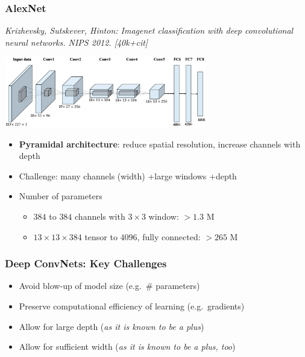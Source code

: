 \documentclass[compress]{beamer}
\newcommand{\textbblue}[1]{{\bf\color{Blue} #1}}
\newcommand{\is}[1]{\setlength{\itemsep}{#1}}
\begin{document}
\begin{frame} \frametitle{AlexNet}
{\small \textit{Krizhevsky, Sutskever, Hinton: Imagenet classification with deep convolutional neural networks. NIPS 2012. [40k+cit]}}
\begin{center}
\includegraphics[width=0.66\textwidth]{./figures/alexnet.png}
\end{center}
\begin{itemize} \is{2mm}
\item \textbblue{Pyramidal architecture}: reduce spatial resolution, increase channels with depth
\item Challenge: many channels (width) +large windows +depth
\item Number of parameters\\[1mm]
\begin{itemize}\is{1mm}
\item $384$ to $384$ channels with  $3 \times 3$ window: $>1.3$ M
\item $13 \times 13 \times 384$ tensor to $4096$, fully connected: $>265$ M
\end{itemize}
\end{itemize}
\end{frame}

\begin{frame} \frametitle{Deep ConvNets: Key Challenges}
\begin{itemize} \is{3mm}
\item Avoid blow-up of model size (e.g.~\# parameters)
\item Preserve computational efficiency of learning (e.g.~gradients)
\item Allow for large depth (\textit{as it is known to be a plus})
\item Allow for sufficient width (\textit{as it is known to be a plus, too})
\end{itemize}
\end{frame}
\end{document}
